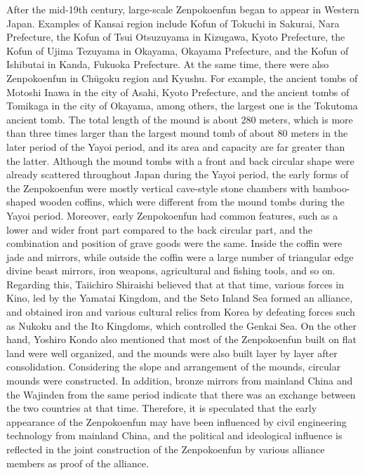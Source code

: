\begin{tcolorbox}[breakable, colback=white, colframe=black!80,
  boxrule=0.6pt, arc=0mm, left=3mm, right=3mm, top=2mm, bottom=2mm]
\ttfamily\small\raggedright
After the mid-{}19th century, large-{}scale Zenpokoenfun began to appear in Western Japan. Examples of Kansai region include Kofun of Tokuchi in Sakurai, Nara Prefecture, the Kofun of Tsui Otsuzuyama in Kizugawa, Kyoto Prefecture, the Kofun of Ujima Tezuyama in Okayama, Okayama Prefecture, and the Kofun of Ishibutai in Kanda, Fukuoka Prefecture. At the same time, there were also Zenpokoenfun in Chūgoku region and Kyushu. For example, the ancient tombs of Motoshi Inawa in the city of Asahi, Kyoto Prefecture, and the ancient tombs of Tomikaga in the city of Okayama, among others, the largest one is the Tokutoma ancient tomb. The total length of the mound is about 280 meters, which is more than three times larger than the largest mound tomb of about 80 meters in the later period of the Yayoi period, and its area and capacity are far greater than the latter. Although the mound tombs with a front and back circular shape were already scattered throughout Japan during the Yayoi period, the early forms of the Zenpokoenfun were mostly vertical cave-{}style stone chambers with bamboo-{}shaped wooden coffins, which were different from the mound tombs during the Yayoi period. Moreover, early Zenpokoenfun had common features, such as a lower and wider front part compared to the back circular part, and the combination and position of grave goods were the same. Inside the coffin were jade and mirrors, while outside the coffin were a large number of triangular edge divine beast mirrors, iron weapons, agricultural and fishing tools, and so on. Regarding this, Taiichiro Shiraishi believed that at that time, various forces in Kino, led by the Yamatai Kingdom, and the Seto Inland Sea formed an alliance, and obtained iron and various cultural relics from Korea by defeating forces such as Nukoku and the Ito Kingdoms, which controlled the Genkai Sea. On the other hand, Yoshiro Kondo also mentioned that most of the Zenpokoenfun built on flat land were well organized, and the mounds were also built layer by layer after consolidation. Considering the slope and arrangement of the mounds, circular mounds were constructed. In addition, bronze mirrors from mainland China and the \textquotedbl{}Wajinden\textquotedbl{} from the same period indicate that there was an exchange between the two countries at that time. Therefore, it is speculated that the early appearance of the Zenpokoenfun may have been influenced by civil engineering technology from mainland China, and the political and ideological influence is reflected in the joint construction of the Zenpokoenfun by various alliance members as proof of the alliance.\par

\end{tcolorbox}
